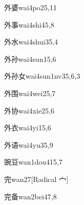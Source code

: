 \begin{verbete}{外婆}{wai4po2}{5,11}
\end{verbete}

\begin{verbete}{外事}{wai4shi4}{5,8}
\end{verbete}

\begin{verbete}{外水}{wai4shui3}{5,4}
\end{verbete}

\begin{verbete}{外孙}{wai4sun1}{5,6}
\end{verbete}

\begin{verbete}{外孙女}{wai4sun1nv3}{5,6,3}
\end{verbete}

\begin{verbete}{外围}{wai4wei2}{5,7}
\end{verbete}

\begin{verbete}{外协}{wai4xie2}{5,6}
\end{verbete}

\begin{verbete}{外衣}{wai4yi1}{5,6}
\end{verbete}

\begin{verbete}{外语}{wai4yu3}{5,9}
\end{verbete}

\begin{verbete}{豌豆}{wan1dou4}{15,7}
\end{verbete}

\begin{verbete}{完}{wan2}{7}[Radical 宀]
\end{verbete}

\begin{verbete}{完备}{wan2bei4}{7,8}
\end{verbete}

